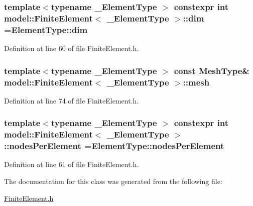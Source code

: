 \subsubsection[{dim}]{\setlength{\rightskip}{0pt plus 5cm}template$<$typename \+\_\+\+Element\+Type $>$ constexpr int {\bf model\+::\+Finite\+Element}$<$ \+\_\+\+Element\+Type $>$\+::dim =Element\+Type\+::dim\hspace{0.3cm}{\ttfamily [static]}}\label{classmodel_1_1_finite_element_a818c65bf8f508c121f1990d430c2b0c0}


Definition at line 60 of file Finite\+Element.\+h.

\hypertarget{classmodel_1_1_finite_element_af628b0a6e34a2ce0d667c32519ca71c4}{}
\subsubsection[{mesh}]{\setlength{\rightskip}{0pt plus 5cm}template$<$typename \+\_\+\+Element\+Type $>$ const {\bf Mesh\+Type}\& {\bf model\+::\+Finite\+Element}$<$ \+\_\+\+Element\+Type $>$\+::mesh}\label{classmodel_1_1_finite_element_af628b0a6e34a2ce0d667c32519ca71c4}


Definition at line 74 of file Finite\+Element.\+h.

\hypertarget{classmodel_1_1_finite_element_a3a69660c59f2bb88f63e0cfc6a5a51df}{}
\subsubsection[{nodes\+Per\+Element}]{\setlength{\rightskip}{0pt plus 5cm}template$<$typename \+\_\+\+Element\+Type $>$ constexpr int {\bf model\+::\+Finite\+Element}$<$ \+\_\+\+Element\+Type $>$\+::nodes\+Per\+Element =Element\+Type\+::nodes\+Per\+Element\hspace{0.3cm}{\ttfamily [static]}}\label{classmodel_1_1_finite_element_a3a69660c59f2bb88f63e0cfc6a5a51df}


Definition at line 61 of file Finite\+Element.\+h.



The documentation for this class was generated from the following file\+:\begin{DoxyCompactItemize}
\item 
\hyperlink{_finite_element_8h}{Finite\+Element.\+h}\end{DoxyCompactItemize}
